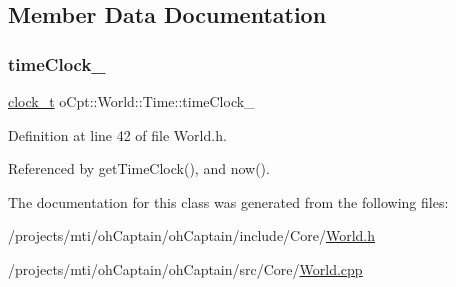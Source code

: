 \subsection{Member Data Documentation}
\hypertarget{classo_cpt_1_1_world_1_1_time_a219308dd501f332e4d49f30ad4e5206e}{}\label{classo_cpt_1_1_world_1_1_time_a219308dd501f332e4d49f30ad4e5206e} 
\subsubsection{\texorpdfstring{time\+Clock\+\_\+}{timeClock\_}}
{\footnotesize\ttfamily \hyperlink{classo_cpt_1_1_world_1_1_time_ac41de01610f32d0ace4844ed3bf454f7}{clock\+\_\+t} o\+Cpt\+::\+World\+::\+Time\+::time\+Clock\+\_\+\hspace{0.3cm}{\ttfamily [private]}}



Definition at line 42 of file World.\+h.



Referenced by get\+Time\+Clock(), and now().



The documentation for this class was generated from the following files\+:\begin{DoxyCompactItemize}
\item 
/projects/mti/oh\+Captain/oh\+Captain/include/\+Core/\hyperlink{_world_8h}{World.\+h}\item 
/projects/mti/oh\+Captain/oh\+Captain/src/\+Core/\hyperlink{_world_8cpp}{World.\+cpp}\end{DoxyCompactItemize}
